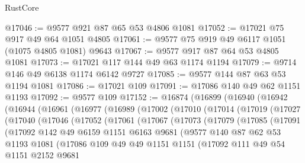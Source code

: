 \begin{lexlean}{RustCore}
\begin{coremodule}
@17046 := @9577 @921 @87 @65 @53 @4806 @1081
@17052 := @17021 @75 @917 @49 @64 @1051 @4805
@17061 := @9577 @75 @919 @49 @6117 @1051 (@1075 @4805 @1081) @9643
@17067 := @9577 @917 @87 @64 @53 @4805 @1081
@17073 := @17021 @117 @144 @49 @63 @1174 @1194
@17079 := @9714 @146 @49 @6138 @1174 @6142 @9727
@17085 := @9577 @144 @87 @63 @53 @1194 @1081
@17086 := @17021 @109
@17091 := @17086 @140 @49 @62 @1151 @1193
@17092 := @9577 @109
@17152 := @16874
    (@16899
      (@16940
        (@16942
          (@16944
            (@16961
              (@16977
                (@16989
                  (@17002
                    (@17010
                      (@17014
                        (@17019
                          (@17027
                            (@17040
                              (@17046
                                (@17052
                                  (@17061
                                    (@17067
                                      (@17073
                                        (@17079
                                          (@17085
                                            (@17091
                                              (@17092
                                                @142
                                                @49
                                                @6159
                                                @1151
                                                @6163
                                                @9681
                                                (@9577
                                                  @140
                                                  @87
                                                  @62
                                                  @53
                                                  @1193
                                                  @1081
                                                  (@17086
                                                    @109
                                                    @49
                                                    @49
                                                    @1151
                                                    @1151
                                                    (@17092
                                                      @111
                                                      @49
                                                      @54
                                                      @1151
                                                      @2152
                                                      @9681

\end{coremodule}
\end{lexlean}
